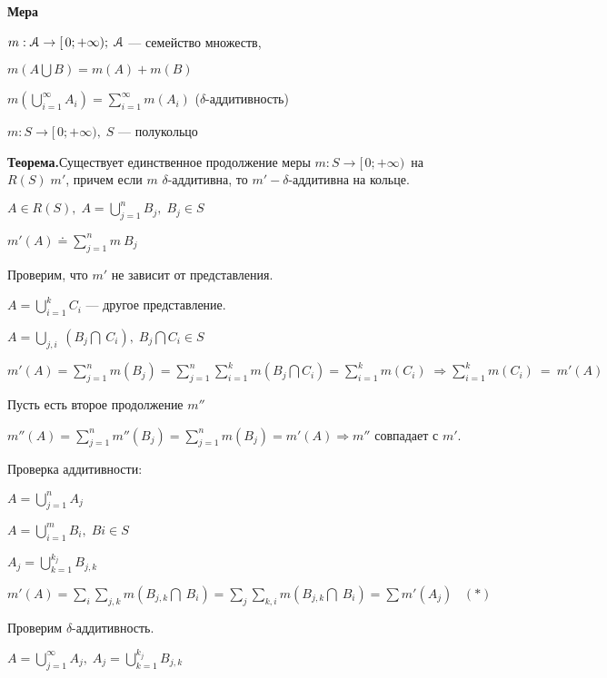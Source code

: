 \begin{center}
\textbf{Мера}
\end{center}


$m: \EuScript{A} \rightarrow [\,0;+\infty);\; \EuScript{A}$ ---
семейство множеств,
%
%
%
%
%
%
%

$m (A \bigcup B) = m(A) + m(B)$

$m(\bigcup_{i=1}^\infty A_i) = \sum_{i=1}^\infty m(A_i)$
($\delta$-аддитивность)

$m: S \rightarrow [\,0;+\infty), \; S $ --- полукольцо

\textbf{Теорема.}\quad Существует единственное продолжение меры
$m: S \rightarrow [\,0;+\infty)$~на~$R(S)\; m'$, причем если $m$
$\delta$-аддитивна, то $m' - \delta$-аддитивна на кольце.


$A \in R(S), \; A = \bigcup_{j=1}^n B_j, \; B_j \in S$

$m'(A) \doteq \sum_{j=1}^n m\:B_j$

Проверим, что $m'$ не зависит от представления.

$A = \bigcup_{i=1}^k C_i$ --- другое представление.

$A = \bigcup_{j,i}\: (B_j \bigcap\: C_i),\; B_j \bigcap C_i \in S$

$m'(A) = \sum_{j=1}^n m(B_j) = \sum_{j=1}^n \sum_{i=1}^k m(B_j
\bigcap C_i) = \sum_{i=1}^k m(C_i) \; \Rightarrow \sum_{i=1}^k
m(C_i)~=~m'(A)$

Пусть есть второе продолжение $m''$

$m''(A) = \sum_{j=1}^n m''(B_j) = \sum_{j=1}^n m(B_j) = m'(A)
\Rightarrow m''$ совпадает с $m'.$

Проверка аддитивности:

$A = \bigcup_{j=1}^n A_j$

$A = \bigcup_{i=1}^m B_i,\; Bi \in S$

$A_j = \bigcup_{k=1}^{k_j} B_{j,k}$

$m'(A) = \sum_i \sum_{j,k} m(B_{j,k} \bigcap\: B_i) = \sum_j
\sum_{k,i} m(B_{j,k}\bigcap\: B_i) = \sum m'(A_j) \;\;\; (*)$

Проверим $\delta$-аддитивность.

$A = \bigcup_{j=1}^{\infty} A_j, \; A_j = \bigcup_{k=1}^{k_j}
B_{j,k}$


%
%
%
%

